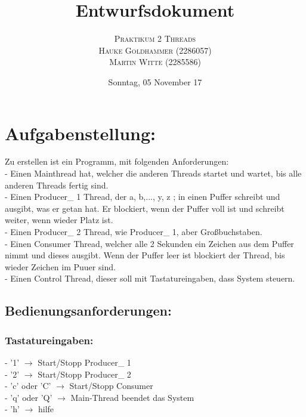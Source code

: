 \documentclass[paper=a4, fontsize=12pt]{article}
\title{\vspace{-15mm}\fontsize{24pt}{10pt}\selectfont\textbf{Entwurfsdokument}} %
\author{
    \large
    {\textsc{Praktikum 2 Threads}}\\[2mm]
    {\textsc{Hauke Goldhammer (2286057)}}\\[2mm]
    {\textsc{Martin Witte (2285586)}}\\[2mm]
}
\date{Sonntag, 05 November 17} %
\begin{document}
\maketitle %
\thispagestyle{fancy} %

\section{Aufgabenstellung:}
Zu erstellen ist ein Programm, mit folgenden Anforderungen:\\
- Einen Mainthread hat, welcher die anderen Threads startet und wartet, bis alle anderen Threads fertig sind.\\
- Einen Producer\_ 1 Thread, der a, b,..., y, z ; in einen Puffer schreibt und ausgibt, was er getan hat. Er blockiert, wenn der Puffer voll ist und schreibt weiter, wenn wieder Platz ist.\\
- Einen Producer\_ 2 Thread, wie Producer\_ 1, aber Großbuchstaben.\\
- Einen Consumer Thread, welcher alle 2 Sekunden ein Zeichen aus dem Puffer nimmt und dieses ausgibt. Wenn der Puffer leer ist blockiert der Thread, bis wieder Zeichen im Puuer sind.\\
- Einen Control Thread, dieser soll mit Tastatureingaben, dass System steuern.

\subsection{Bedienungsanforderungen:}
\subsubsection{Tastatureingaben:}
- '1' $\rightarrow$ Start/Stopp Producer\_ 1\\
- '2' $\rightarrow$ Start/Stopp Producer\_ 2\\
- 'c' oder 'C' $\rightarrow$ Start/Stopp Consumer\\
- 'q' oder 'Q' $\rightarrow$ Main-Thread beendet das System\\
- 'h' $\rightarrow$ hilfe\\
\end{document}
